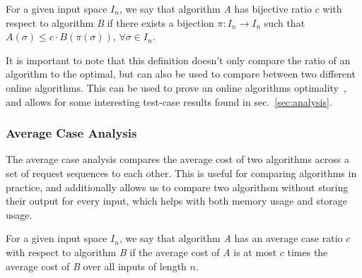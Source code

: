 \begin{definition}
    \label{def:bij}
    For a given input space $I_n$, we say that algorithm \textit{A} has bijective ratio $c$ with respect to algorithm \textit{B} if there exists a bijection $\pi:I_n \rightarrow I_n$ such that $A(\sigma) \leq c\cdot B(\pi(\sigma))$, $\forall \sigma \in I_n$. 
\end{definition}

It is important to note that this definition doesn't only compare the ratio of an algorithm to the optimal, but can also be used to compare between two different online algorithms. This can be used to prove an online algorithms optimality~\cite{bij2016}, and allows for some interesting test-case results found in sec.~\ref{sec:analysis}.

\subsubsection*{Average Case Analysis}
\label{sec:Avg}
The average case analysis compares the average cost of two algorithms across a set of request sequences to each other. This is useful for comparing algorithms in practice, and additionally allows us to compare two algorithsm without storing their output for every input, which helps with both memory usage and storage usage.

\begin{definition}
    \label{def:avg}
    For a given input space $I_n$, we say that algorithm \textit{A} has an average case ratio $c$ with respect to algorithm \textit{B} if the average cost of \textit{A} is at most $c$ times the average cost of \textit{B} over all inputs of length $n$.
\end{definition}